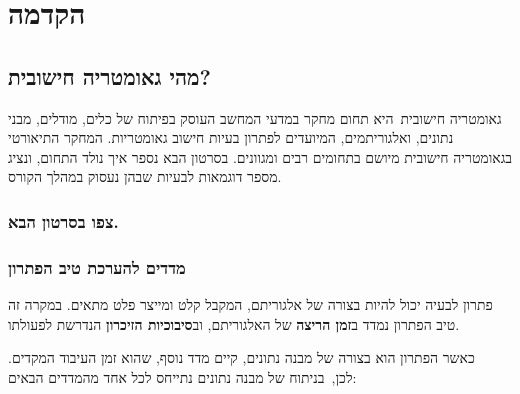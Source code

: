 \documentclass[
]{book}
\theoremstyle{definition}
\theoremstyle{definition}
\theoremstyle{definition}
\theoremstyle{definition}
\theoremstyle{remark}
\begin{document}
\hypertarget{ux5d4ux5e7ux5d3ux5deux5d4}{%
\section{הקדמה}\label{ux5d4ux5e7ux5d3ux5deux5d4}}

\hypertarget{ux5deux5d4ux5d9-ux5d2ux5d0ux5d5ux5deux5d8ux5e8ux5d9ux5d4-ux5d7ux5d9ux5e9ux5d5ux5d1ux5d9ux5ea}{%
\subsection*{\texorpdfstring{\textbf{מהי גאומטריה חישובית?}}{מהי גאומטריה חישובית?}}\label{ux5deux5d4ux5d9-ux5d2ux5d0ux5d5ux5deux5d8ux5e8ux5d9ux5d4-ux5d7ux5d9ux5e9ux5d5ux5d1ux5d9ux5ea}}

גאומטריה חישובית~היא תחום מחקר במדעי המחשב העוסק בפיתוח של כלים, מודלים, מבני נתונים, ואלגוריתמים, המיועדים לפתרון בעיות חישוב גאומטריות. המחקר התיאורטי בגאומטריה חישובית מיושם בתחומים רבים ומגוונים. בסרטון הבא נספר איך נולד התחום, ונציג מספר דוגמאות לבעיות שבהן נעסוק במהלך הקורס.

\hypertarget{ux5e6ux5e4ux5d5-ux5d1ux5e1ux5e8ux5d8ux5d5ux5df-ux5d4ux5d1ux5d0.}{%
\subsubsection*{\texorpdfstring{\textbf{צפו בסרטון הבא.}}{צפו בסרטון הבא.}}\label{ux5e6ux5e4ux5d5-ux5d1ux5e1ux5e8ux5d8ux5d5ux5df-ux5d4ux5d1ux5d0.}}

\hypertarget{ux5deux5d3ux5d3ux5d9ux5dd-ux5dcux5d4ux5e2ux5e8ux5dbux5ea-ux5d8ux5d9ux5d1-ux5d4ux5e4ux5eaux5e8ux5d5ux5df}{%
\subsubsection*{\texorpdfstring{\textbf{מדדים להערכת טיב הפתרון}}{מדדים להערכת טיב הפתרון}}\label{ux5deux5d3ux5d3ux5d9ux5dd-ux5dcux5d4ux5e2ux5e8ux5dbux5ea-ux5d8ux5d9ux5d1-ux5d4ux5e4ux5eaux5e8ux5d5ux5df}}

פתרון לבעיה יכול להיות בצורה של אלגוריתם, המקבל קלט ומייצר פלט מתאים. במקרה זה טיב הפתרון נמדד ב\textbf{זמן הריצה} של האלגוריתם, וב\textbf{סיבוכיות הזיכרון} הנדרשת לפעולתו.~

כאשר הפתרון הוא בצורה של מבנה נתונים, קיים מדד נוסף, שהוא זמן העיבוד המקדים. לכן,~בניתוח של מבנה נתונים נתייחס לכל אחד מהמדדים הבאים:
\end{document}

